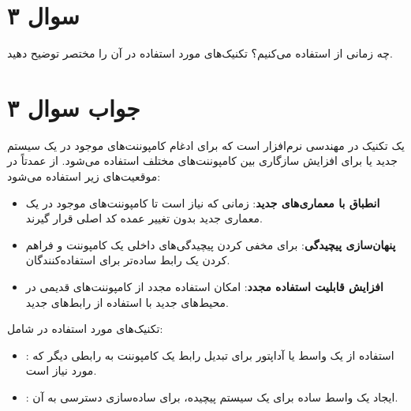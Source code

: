 \section*{سوال ۳}

چه زمانی از
استفاده می‌کنیم؟ تکنیک‌های مورد استفاده در آن را مختصر توضیح دهید.


\section*{جواب سوال ۳}

یک تکنیک در مهندسی نرم‌افزار است که برای ادغام کامپوننت‌های موجود در یک سیستم جدید یا برای افزایش سازگاری بین کامپوننت‌های مختلف استفاده می‌شود. از 
عمدتاً در موقعیت‌های زیر استفاده می‌شود:

\begin{itemize}
	\item \textbf{انطباق با معماری‌های جدید}: زمانی که نیاز است تا کامپوننت‌های موجود در یک معماری جدید بدون تغییر عمده کد اصلی قرار گیرند.
	\item \textbf{پنهان‌سازی پیچیدگی}: برای مخفی کردن پیچیدگی‌های داخلی یک کامپوننت و فراهم کردن یک رابط ساده‌تر برای استفاده‌کنندگان.
	\item \textbf{افزایش قابلیت استفاده مجدد}: امکان استفاده مجدد از کامپوننت‌های قدیمی در محیط‌های جدید با استفاده از رابط‌های جدید.
\end{itemize}

تکنیک‌های مورد استفاده در
شامل:
\begin{itemize}
	\item {}: استفاده از یک واسط یا آداپتور برای تبدیل رابط یک کامپوننت به رابطی دیگر که مورد نیاز است.
	\item {}: ایجاد یک واسط ساده برای یک سیستم پیچیده، برای ساده‌سازی دسترسی به آن.
\end{itemize}
